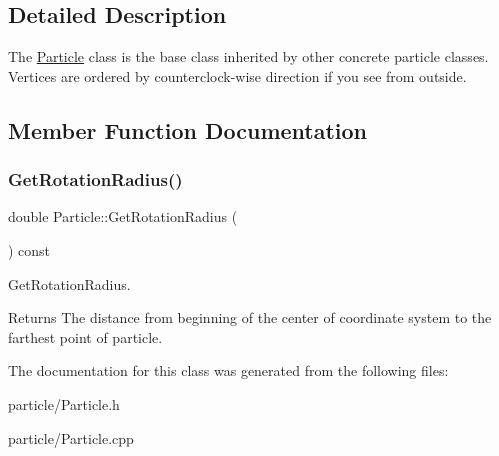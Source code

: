 \subsection{Detailed Description}
The \mbox{\hyperlink{class_particle}{Particle}} class is the base class inherited by other concrete particle classes. Vertices are ordered by counterclock-\/wise direction if you see from outside. 

\subsection{Member Function Documentation}
\mbox{\label{class_particle_ab06b62449ba3213e3f8bf580a910dd66}} 
\subsubsection{\texorpdfstring{Get\+Rotation\+Radius()}{GetRotationRadius()}}
{\footnotesize\ttfamily double Particle\+::\+Get\+Rotation\+Radius (\begin{DoxyParamCaption}{ }\end{DoxyParamCaption}) const}



Get\+Rotation\+Radius. 

\begin{DoxyReturn}{Returns}
The distance from beginning of the center of coordinate system to the farthest point of particle. 
\end{DoxyReturn}


The documentation for this class was generated from the following files\+:\begin{DoxyCompactItemize}
\item 
particle/Particle.\+h\item 
particle/Particle.\+cpp\end{DoxyCompactItemize}
